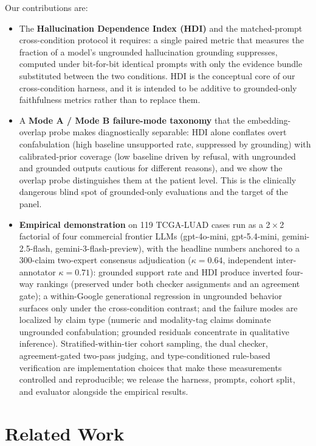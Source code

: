 \documentclass{article}
\theoremstyle{plain}
\begin{document}
Our contributions are:
\begin{itemize}
\item The \textbf{Hallucination Dependence Index (HDI)} and the matched-prompt cross-condition protocol it requires: a single paired metric that measures the fraction of a model's ungrounded hallucination grounding suppresses, computed under bit-for-bit identical prompts with only the evidence bundle substituted between the two conditions. HDI is the conceptual core of our cross-condition harness, and it is intended to be additive to grounded-only faithfulness metrics rather than to replace them.
\item A \textbf{Mode A / Mode B failure-mode taxonomy} that the embedding-overlap probe makes diagnostically separable: HDI alone conflates overt confabulation (high baseline unsupported rate, suppressed by grounding) with calibrated-prior coverage (low baseline driven by refusal, with ungrounded and grounded outputs cautious for different reasons), and we show the overlap probe distinguishes them at the patient level. This is the clinically dangerous blind spot of grounded-only evaluations and the target of the panel.
\item \textbf{Empirical demonstration} on 119 TCGA-LUAD cases run as a 2\,$\times$\,2 factorial of four commercial frontier LLMs (gpt-4o-mini, gpt-5.4-mini, gemini-2.5-flash, gemini-3-flash-preview), with the headline numbers anchored to a 300-claim two-expert consensus adjudication ($\kappa{=}0.64$, independent inter-annotator $\kappa{=}0.71$): grounded support rate and HDI produce inverted four-way rankings (preserved under both checker assignments and an agreement gate); a within-Google generational regression in ungrounded behavior surfaces only under the cross-condition contrast; and the failure modes are localized by claim type (numeric and modality-tag claims dominate ungrounded confabulation; grounded residuals concentrate in qualitative inference). Stratified-within-tier cohort sampling, the dual checker, agreement-gated two-pass judging, and type-conditioned rule-based verification are implementation choices that make these measurements controlled and reproducible; we release the harness, prompts, cohort split, and evaluator alongside the empirical results.
\end{itemize}

\section{Related Work}
\label{sec:related}
\end{document}

